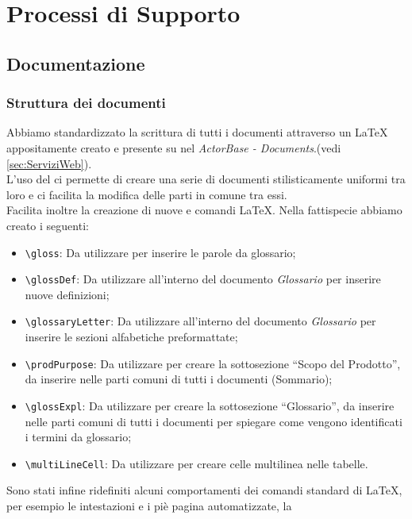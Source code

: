 \documentclass{scalatekids-article}
\begin{document}
\section{Processi di Supporto}

\subsection{Documentazione}

\subsubsection{Struttura dei documenti}

\label{sec:strutturadoc}
Abbiamo standardizzato la scrittura di tutti i documenti attraverso un
 \LaTeX\xspace appositamente creato e presente su
\textit{} nel  \textit{ActorBase -
Documents}.(vedi \ref{sec:ServiziWeb}).\\ L'uso del  ci permette di creare una serie di documenti
stilisticamente uniformi tra loro e ci facilita la modifica delle parti in
comune tra essi.\\Facilita inoltre la creazione di nuove  e comandi
\LaTeX\xspace. Nella fattispecie abbiamo creato i seguenti:
\begin{itemize}
    \item\verb=\gloss=: Da utilizzare per inserire le parole da glossario;
    \item\verb=\glossDef=: Da utilizzare all'interno del documento \textit{Glossario} per inserire nuove definizioni;
    \item\verb=\glossaryLetter=: Da utilizzare all'interno del documento \textit{Glossario} per inserire le sezioni alfabetiche preformattate;
    \item\verb=\prodPurpose=: Da utilizzare per creare la sottosezione ``Scopo del Prodotto'', da inserire nelle parti comuni di tutti i documenti (Sommario);
    \item\verb=\glossExpl=: Da utilizzare per creare la sottosezione ``Glossario'', da inserire nelle parti comuni di tutti i documenti per spiegare come vengono identificati i termini da glossario;
    \item\verb=\multiLineCell=: Da utilizzare per creare celle multilinea nelle tabelle.
\end{itemize}
Sono stati infine ridefiniti alcuni comportamenti dei comandi standard di
\LaTeX\xspace, per esempio le intestazioni e i piè pagina automatizzate, la
\end{document}
